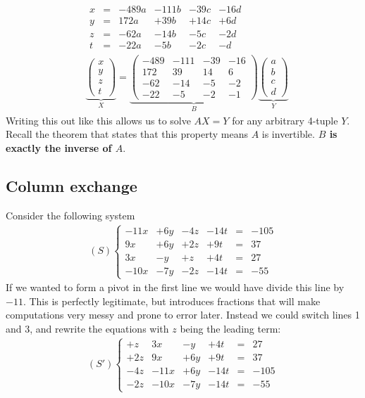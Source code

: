 \begin{align*}
&
\begin{array}{rlrrrr}
   x &=& -489a & -111b & -39c & -16d \\
   y &=&  172a &  +39b & +14c &  +6d \\
   z &=&  -62a &  -14b &  -5c &  -2d \\
   t &=&  -22a &   -5b &  -2c &   -d
\end{array}
\\
&
\underbrace{
\begin{pmatrix}
   x \\
   y \\
   z \\
   t
\end{pmatrix}
}_{X}
=
\underbrace{
\begin{pmatrix}
   -489 & -111 & -39 & -16 \\
    172 &   39 &  14 &   6 \\
    -62 &  -14 &  -5 &  -2 \\
    -22 &   -5 &  -2 &  -1
\end{pmatrix}
}_{B}
\underbrace{
\begin{pmatrix}
   a \\
   b \\
   c \\
   d
\end{pmatrix}
}_{Y}
\end{align*}
Writing this out like this allows us to solve $AX=Y$ for any arbitrary 4-tuple $Y$. Recall the theorem that states that this property means $A$ is invertible. \textbf{$B$ is exactly the inverse of $A$}.

\subsection*{Column exchange}
Consider the following system
\begin{align*}
(S)
\left\{
\begin{matrix}
 -11x &  +6y &  -4z & -14t &=& -105 \\
   9x &  +6y &  +2z &  +9t &=&   37 \\
   3x &   -y &   +z &  +4t &=&   27 \\
 -10x &  -7y &  -2z & -14t &=&  -55
\end{matrix}
\right.
\end{align*}
If we wanted to form a pivot in the first line we would have divide this line by $-11$. This is perfectly legitimate, but introduces fractions that will make computations very messy and prone to error later. Instead we could switch lines 1 and 3, and rewrite the equations with $z$ being the leading term:
\begin{align*}
(S')
\left\{
\begin{matrix}
   +z &  3x &   -y &  +4t &=&   27 \\
  +2z &  9x &  +6y &  +9t &=&   37 \\
  -4z &-11x &  +6y & -14t &=& -105 \\
  -2z &-10x &  -7y & -14t &=&  -55
\end{matrix}
\right.
\end{align*}


